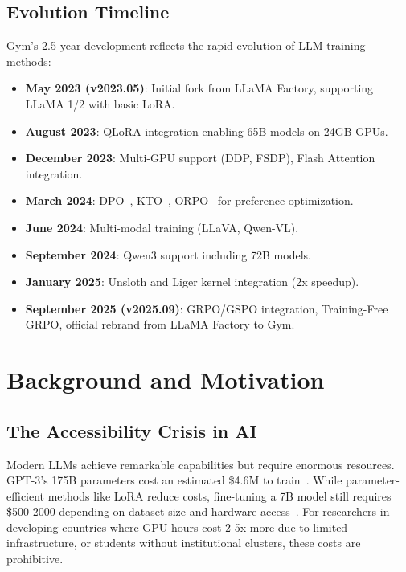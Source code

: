 \documentclass[11pt,letterpaper]{article}
\begin{document}
\subsection{Evolution Timeline}

Gym's 2.5-year development reflects the rapid evolution of LLM training methods:

\begin{itemize}
\item \textbf{May 2023 (v2023.05)}: Initial fork from LLaMA Factory, supporting LLaMA 1/2 with basic LoRA.
\item \textbf{August 2023}: QLoRA integration enabling 65B models on 24GB GPUs.
\item \textbf{December 2023}: Multi-GPU support (DDP, FSDP), Flash Attention integration.
\item \textbf{March 2024}: DPO~\citep{rafailov2023dpo}, KTO~\citep{ethayarajh2024kto}, ORPO~\citep{hong2024orpo} for preference optimization.
\item \textbf{June 2024}: Multi-modal training (LLaVA, Qwen-VL).
\item \textbf{September 2024}: Qwen3 support including 72B models.
\item \textbf{January 2025}: Unsloth and Liger kernel integration (2x speedup).
\item \textbf{September 2025 (v2025.09)}: GRPO/GSPO integration, Training-Free GRPO, official rebrand from LLaMA Factory to Gym.
\end{itemize}

\section{Background and Motivation}

\subsection{The Accessibility Crisis in AI}

Modern LLMs achieve remarkable capabilities but require enormous resources. GPT-3's 175B parameters cost an estimated \$4.6M to train~\citep{brown2020gpt3}. While parameter-efficient methods like LoRA reduce costs, fine-tuning a 7B model still requires \$500-2000 depending on dataset size and hardware access~\citep{hu2021lora}. For researchers in developing countries where GPU hours cost 2-5x more due to limited infrastructure, or students without institutional clusters, these costs are prohibitive.
\end{document}
